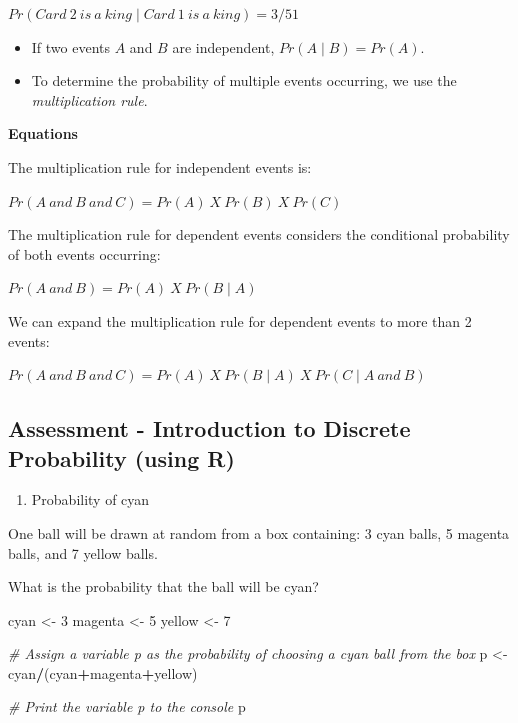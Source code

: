 \documentclass[
]{article}
\newenvironment{Shaded}{\begin{snugshade}}{\end{snugshade}}
\newcommand{\CommentTok}[1]{\textcolor[rgb]{0.56,0.35,0.01}{\textit{#1}}}
\newcommand{\DecValTok}[1]{\textcolor[rgb]{0.00,0.00,0.81}{#1}}
\newcommand{\NormalTok}[1]{#1}
\newcommand{\OperatorTok}[1]{\textcolor[rgb]{0.81,0.36,0.00}{\textbf{#1}}}
\newcommand{\StringTok}[1]{\textcolor[rgb]{0.31,0.60,0.02}{#1}}
\providecommand{\tightlist}{%
  \setlength{\itemsep}{0pt}\setlength{\parskip}{0pt}}
\begin{document}
\(Pr(Card\:2\:is\:a\:king \mid Card\:1\:is\:a\:king) = 3/51\)

\begin{itemize}
\tightlist
\item
  If two events \(A\) and \(B\) are independent,
  \(Pr(A \mid B) = Pr(A)\).
\item
  To determine the probability of multiple events occurring, we use the
  \emph{multiplication rule}.
\end{itemize}

\textbf{Equations}

The multiplication rule for independent events is:

\(Pr(A\:and\:B\:and\:C) = Pr(A)\:X\:Pr(B)\:X\:Pr(C)\)

The multiplication rule for dependent events considers the conditional
probability of both events occurring:

\(Pr(A\:and\:B) = Pr(A)\:X\:Pr(B \mid A)\)

We can expand the multiplication rule for dependent events to more than
2 events:

\(Pr(A\:and\:B\:and\:C) = Pr(A)\:X\:Pr(B \mid A)\:X\:Pr(C \mid A\:and\:B)\)

\hypertarget{assessment---introduction-to-discrete-probability-using-r}{%
\subsection{Assessment - Introduction to Discrete Probability (using
R)}\label{assessment---introduction-to-discrete-probability-using-r}}

\begin{enumerate}
\def\labelenumi{\arabic{enumi}.}
\tightlist
\item
  Probability of cyan
\end{enumerate}

One ball will be drawn at random from a box containing: 3 cyan balls, 5
magenta balls, and 7 yellow balls.

What is the probability that the ball will be cyan?

\begin{Shaded}
\begin{Highlighting}[]
\NormalTok{cyan \textless{}{-}}\StringTok{ }\DecValTok{3}
\NormalTok{magenta \textless{}{-}}\StringTok{ }\DecValTok{5}
\NormalTok{yellow \textless{}{-}}\StringTok{ }\DecValTok{7}

\CommentTok{\# Assign a variable \textasciigrave{}p\textasciigrave{} as the probability of choosing a cyan ball from the box}
\NormalTok{p \textless{}{-}}\StringTok{ }\NormalTok{cyan}\OperatorTok{/}\NormalTok{(cyan}\OperatorTok{+}\NormalTok{magenta}\OperatorTok{+}\NormalTok{yellow)}

\CommentTok{\# Print the variable \textasciigrave{}p\textasciigrave{} to the console}
\NormalTok{p}
\end{Highlighting}
\end{Shaded}
\end{document}
